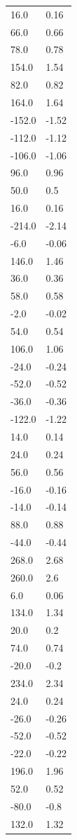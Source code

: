 \begin{longtable}{ll}
16.0 & 0.16 \\
66.0 & 0.66 \\
78.0 & 0.78 \\
154.0 & 1.54 \\
82.0 & 0.82 \\
164.0 & 1.64 \\
-152.0 & -1.52 \\
-112.0 & -1.12 \\
-106.0 & -1.06 \\
96.0 & 0.96 \\
50.0 & 0.5 \\
16.0 & 0.16 \\
-214.0 & -2.14 \\
-6.0 & -0.06 \\
146.0 & 1.46 \\
36.0 & 0.36 \\
58.0 & 0.58 \\
-2.0 & -0.02 \\
54.0 & 0.54 \\
106.0 & 1.06 \\
-24.0 & -0.24 \\
-52.0 & -0.52 \\
-36.0 & -0.36 \\
-122.0 & -1.22 \\
14.0 & 0.14 \\
24.0 & 0.24 \\
56.0 & 0.56 \\
-16.0 & -0.16 \\
-14.0 & -0.14 \\
88.0 & 0.88 \\
-44.0 & -0.44 \\
268.0 & 2.68 \\
260.0 & 2.6 \\
6.0 & 0.06 \\
134.0 & 1.34 \\
20.0 & 0.2 \\
74.0 & 0.74 \\
-20.0 & -0.2 \\
234.0 & 2.34 \\
24.0 & 0.24 \\
-26.0 & -0.26 \\
-52.0 & -0.52 \\
-22.0 & -0.22 \\
196.0 & 1.96 \\
52.0 & 0.52 \\
-80.0 & -0.8 \\
132.0 & 1.32 \\

\end{longtable}
